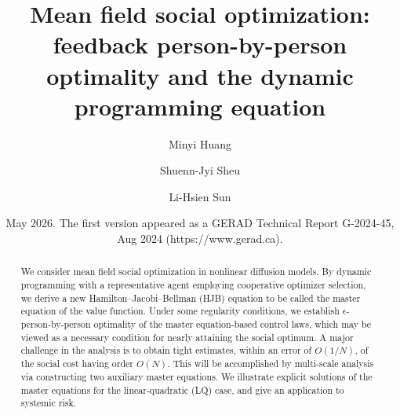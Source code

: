 \documentclass{amsart}
\theoremstyle{definition}
\theoremstyle{remark}
\numberwithin{equation}{section}
\begin{document}
\title[Mean field social optimization: person-by-person optimality]{Mean field social optimization:
 feedback person-by-person optimality and the dynamic programming equation}

\author{Minyi Huang}
\address{School  of Mathematics and Statistics, Carleton University,
Ottawa, ON K1S 5B6, Canada, and GERAD, Montreal, QC H3T 2A7, Canada}


\author{Shuenn-Jyi Sheu}
\address{Department of Mathematics, National Central University, Chung-Li, Taiwan and Department of Mathematical Sciences, National Chengchi University, Taipei, Taiwan}



\author{Li-Hsien Sun}
\address{Institute of Statistics, National Central University, Chung-Li, Taiwan}



\subjclass[2000]{}

\date{May 2026. The first version appeared as a GERAD Technical Report G-2024-45, Aug 2024 (https://www.gerad.ca).}






\begin{abstract}
We consider mean field social optimization in nonlinear diffusion models.
By  dynamic programming with a representative agent employing cooperative optimizer selection,
we derive a new Hamilton--Jacobi--Bellman (HJB) equation to be called the master equation of the value function. Under some regularity conditions, we establish $\epsilon$-person-by-person optimality of the master equation-based control laws, which may be viewed as a necessary condition for nearly attaining the social optimum. A major challenge in the analysis is to obtain tight estimates, within an error of $O(1/N)$, of the social cost having order $O(N)$. This will be accomplished by multi-scale analysis via constructing two auxiliary master equations. We illustrate  explicit solutions of the master equations  for the linear-quadratic (LQ) case, and give an application to systemic risk.
\end{abstract}

\maketitle
\end{document}
